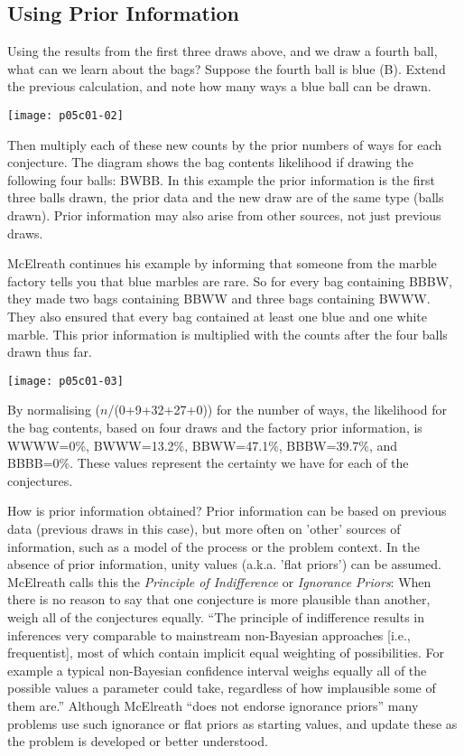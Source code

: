 \subsection{Using Prior Information}
\label{sec:UsingPriorInformation}

Using the results from the first three draws above, and we draw a fourth ball, what can we learn about the bags?  Suppose the fourth ball is blue (B).  Extend the previous calculation, and note how many ways a blue ball can be drawn.
\begin{marginfigure}
\texttt{[image: p05c01-02]}
\end{marginfigure}
Then multiply each of these new counts by the prior numbers of ways for each conjecture.  The diagram shows the bag contents likelihood if  drawing the following four balls:  BWBB.
In this example the prior information is the first three balls drawn, the prior data and the new draw are of the same type (balls drawn).  Prior information may also arise from other sources, not just previous draws.

McElreath \cite{McElreath2015} continues his example by informing that 
someone from the marble factory tells you that blue marbles are rare. So for every bag containing BBBW, they made two bags containing BBWW and three bags containing BWWW. They also ensured that every bag contained at least one blue and one white marble.
This prior information is multiplied with the counts after the four balls drawn thus far.
\begin{marginfigure}
\texttt{[image: p05c01-03]}
\end{marginfigure}
By normalising ($n$/(0+9+32+27+0)) for the number of ways, the likelihood for the bag contents, based on four draws and the factory prior information, is
WWWW=0\%, 
BWWW=13.2\%,
BBWW=47.1\%,
BBBW=39.7\%, and
BBBB=0\%.  These values represent the certainty we have for each of the conjectures.

How is prior information obtained?  Prior information can be based on previous data (previous draws in this case), but more often on 'other' sources of information, such as a model of the process or the problem context. In the absence of prior information, unity values (a.k.a. 'flat priors') can be assumed.  McElreath  calls this the \textit{Principle of Indifference} or \textit{Ignorance Priors}: When there is no reason to say that one conjecture is more plausible than another, weigh all of the conjectures equally. ``The principle of indifference results in inferences very comparable to mainstream non-Bayesian approaches [i.e., frequentist], most of which contain implicit equal weighting of possibilities. For example a typical non-Bayesian confidence interval weighs equally all of the possible values a parameter could take, regardless of how implausible some of them are.''\cite{McElreath2015}  Although McElreath ``does not endorse ignorance priors'' many problems use such ignorance or flat priors as starting values, and update these as the problem is developed or better understood.


